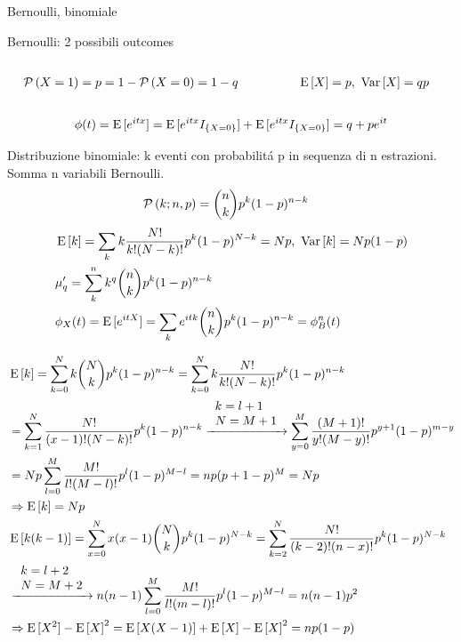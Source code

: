 \documentclass[asd-beamer.tex]{subfiles}%
\begin{document}
\begin{frame}{Bernoulli, binomiale}
\begin{block}{Bernoulli: 2 possibili outcomes}
	\begin{columns}[T]
	\begin{column}{0.6\textwidth}
	\begin{align*}
	&\operatorname{\mathcal{P}}{(X=1)}=p=1-\operatorname{\mathcal{P}}{(X=0)}=1-q
	\end{align*}
	\end{column}
	\begin{column}{0.4\textwidth}
	\begin{align*}
	&\operatorname{E}{[X]}=p,\ \operatorname{Var}{[X]}=qp
	\end{align*}
	\end{column}
	\end{columns}
\[\phi(t)=\operatorname{E}{[e^{itx}]}=\operatorname{E}{[e^{itx}I_{\{X=0\}}]}+\operatorname{E}{[e^{itx}I_{\{X=0\}}]}=q+pe^{it}\]
\end{block}
\begin{block}{Distribuzione binomiale: k eventi con probabilit\'a p in sequenza di n estrazioni. Somma n variabili Bernoulli.}
\begin{align*}
&\operatorname{\mathcal{P}}{(k;n,p)}=\binom{n}{k}p^k(1-p)^{n-k}
\end{align*}
\begin{align*}
&\E{[k]}=\sum_kk\frac{N!}{k!(N-k)!}p^k(1-p)\expy{N-k}=Np,\ \var{[k]}=Np(1-p)\\
&\mu'_q=\sum_k^nk^q\binom{n}{k}p^k(1-p)^{n-k}\\
&\phi_X(t)=\E{[\exp{itX}]}=\sum_k\exp{itk}\binom{n}{k}p^k(1-p)^{n-k}=\phi_B^n(t)
\end{align*}
\end{block}
\end{frame}

\begin{frame}{}
\begin{align*}
&\operatorname{E}{[k]}=\sum_{k=0}^Nk\binom{N}{k}p^k(1-p)^{n-k}=\sum_{k=0}^Nk\frac{N!}{k!(N-k)!}p^k(1-p)^{n-k}\\
&=\sum_{k=1}^N\frac{N!}{(x-1)!(N-k)!}p^k(1-p)^{n-k}\xrightarrow{\begin{array}{l}k=l+1\\N=M+1\\\end{array}}\sum_{y=0}^M\frac{(M+1)!}{y!(M-y)!}p^{y+1}(1-p)^{m-y}\\
&=Np\sum_{l=0}^M\frac{M!}{l!(M-l)!}p^l(1-p)^{M-l}=np(p+1-p)^M=Np\\
&\Rightarrow\operatorname{E}{[k]}=Np\\
&\operatorname{E}{[k(k-1)]}=\sum_{x=0}^Nx(x-1)\binom{N}{k}p^k(1-p)^{N-k}=\sum_{k=2}^N\frac{N!}{(k-2)!(n-x)!}p^k(1-p)^{N-k}\\
&\xrightarrow{\begin{array}{l}k=l+2\\N=M+2\\\end{array}}n(n-1)\sum_{l=0}^M\frac{M!}{l!(m-l)!}p^l(1-p)^{M-l}=n(n-1)p^2\\
&\Rightarrow\operatorname{E}{[X^2]}-\operatorname{E}{[X]}^2=\operatorname{E}{[X(X-1)]}+\operatorname{E}{[X]}-\operatorname{E}{[X]}^2=np(1-p)
\end{align*}
\end{frame}
\end{document}
